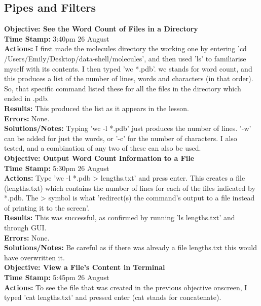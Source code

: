 \documentclass{article}
\begin{document}
\begin{FlushLeft}
\subsection{Pipes and Filters}
\textbf{Objective: See the Word Count of Files in a Directory}\\ 
\textbf{Time Stamp:} 3:40pm 26 August\\
\textbf{Actions:} I first made the molecules directory the working one by entering 'cd /Users/Emily/Desktop/data-shell/molecules', and then used 'ls' to familiarise myself with its contents. I then typed 'wc *.pdb'. wc stands for word count, and this produces a list of the number of lines, words and characters (in that order). So, that specific command listed these for all the files in the directory which ended in .pdb. \\
\textbf{Results:} This produced the list as it appears in the lesson. \\
\textbf{Errors:} None. \\
\textbf{Solutions/Notes:} Typing 'wc -l *.pdb' just produces the number of lines. '-w' can be added for just the words, or '-c' for the number of characters. I also tested, and a combination of any two of these can also be used.\\
\vspace{5mm}
\textbf{Objective: Output Word Count Information to a File }\\ 
\textbf{Time Stamp:} 5:30pm 26 August\\
\textbf{Actions:} Type 'wc -l *.pdb \textgreater{}  lengths.txt' and press enter. This creates a file (lengths.txt) which contains the number of lines for each of the files indicated by *.pdb. The \textgreater{}  symbol is what 'redirect(s) the command's output to a file instead of printing it to the screen'.\\
\textbf{Results:} This was successful, as confirmed by running 'ls lengths.txt' and through GUI.\\
\textbf{Errors:} None. \\
\textbf{Solutions/Notes:} Be careful as if there was already a file lengths.txt this would have overwritten it.\\
\vspace{5mm}
\textbf{Objective: View a File's Content in Terminal}\\ 
\textbf{Time Stamp:} 5:45pm 26 August\\
\textbf{Actions:} To see the file that was created in the previous objective onscreen, I typed 'cat lengths.txt' and pressed enter (cat stands for concatenate).\\

\end{FlushLeft}
\end{document}
